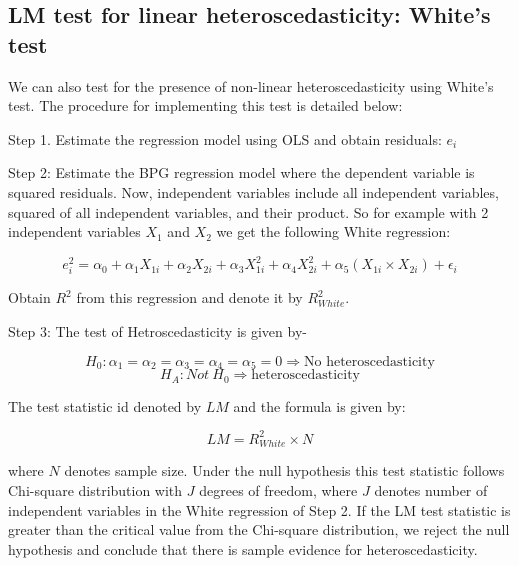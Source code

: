 \documentclass[
]{book}
\theoremstyle{definition}
\theoremstyle{definition}
\theoremstyle{definition}
\theoremstyle{definition}
\theoremstyle{remark}
\begin{document}
\hypertarget{lm-test-for-linear-heteroscedasticity-whites-test}{%
\subsection{LM test for linear heteroscedasticity: White's test}\label{lm-test-for-linear-heteroscedasticity-whites-test}}

We can also test for the presence of non-linear heteroscedasticity using White's test. The procedure for implementing this test is detailed below:

Step 1. Estimate the regression model using OLS and obtain residuals: \(e_i\)

Step 2: Estimate the BPG regression model where the dependent variable is squared residuals. Now, independent variables include all independent variables, squared of all independent variables, and their product. So for example with 2 independent variables \(X_1\) and \(X_2\) we get the following White regression:

\[e^2_i=\alpha_0 + \alpha_1 X_{1i} + \alpha_2 X_{2i} + \alpha_3 X^2_{1i} + \alpha_4 X^2_{2i}+\alpha_5 (X_{1i}\times X_{2i})+ \epsilon_i\]

Obtain \(R^2\) from this regression and denote it by \(R^2_{White}\).

Step 3: The test of Hetroscedasticity is given by-

\[H_0: \alpha_1=\alpha_2=\alpha_3=\alpha_4=\alpha_5=0 \Rightarrow \text{No heteroscedasticity}\]
\[H_A: Not \  H_0 \Rightarrow \text{heteroscedasticity}\]

The test statistic id denoted by \(LM\) and the formula is given by:

\[LM=R^2_{White} \times N\]

where \(N\) denotes sample size. Under the null hypothesis this test statistic follows Chi-square distribution with \(J\) degrees of freedom, where \(J\) denotes number of independent variables in the White regression of Step 2. If the LM test statistic is greater than the critical value from the Chi-square distribution, we reject the null hypothesis and conclude that there is sample evidence for heteroscedasticity.
\end{document}
